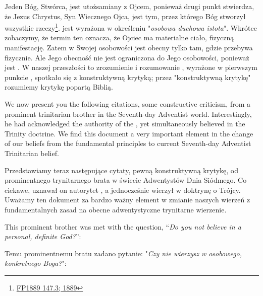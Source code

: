 Jeden Bóg, Stwórca, jest utożsamiany z Ojcem, ponieważ drugi punkt  stwierdza, że Jezus Chrystus, Syn Wiecznego Ojca, jest tym, przez którego Bóg stworzył wszystkie rzeczy\footnote{\href{https://egwwritings.org/?ref=en_FP1889.147.3&para=931.7}{FP1889 147.3; 1889}}.  jest wyrażona w określeniu "\textit{osobowa duchowa istota}". Wkrótce zobaczymy, że termin ten oznacza, że Ojciec ma materialne ciało, fizyczną manifestację. Zatem w Swojej osobowości jest obecny tylko tam, gdzie przebywa fizycznie. Ale Jego obecność nie jest ograniczona do Jego osobowości, ponieważ jest . W naszej przeszłości to zrozumienie i rozumowanie , wyrażone w pierwszym punkcie , spotkało się z konstruktywną krytyką; przez "konstruktywną krytykę" rozumiemy krytykę popartą Biblią.


We now present you the following citations, some constructive criticism, from a prominent trinitarian brother in the Seventh-day Adventist world. Interestingly, he had acknowledged the authority of the , yet simultaneously believed in the Trinity doctrine. We find this document a very important element in the change of our beliefs from the fundamental principles to current Seventh-day Adventist Trinitarian belief.


Przedstawiamy teraz następujące cytaty, pewną konstruktywną krytykę, od prominentnego trynitarnego brata w świecie Adwentystów Dnia Siódmego. Co ciekawe, uznawał on autorytet , a jednocześnie wierzył w doktrynę o Trójcy. Uważamy ten dokument za bardzo ważny element w zmianie naszych wierzeń z fundamentalnych zasad na obecne adwentystyczne trynitarne wierzenie.


This prominent brother was met with the question, “\textit{Do you not believe in a personal, definite God?}”:


Temu prominentnemu bratu zadano pytanie: "\textit{Czy nie wierzysz w osobowego, konkretnego Boga?}":




